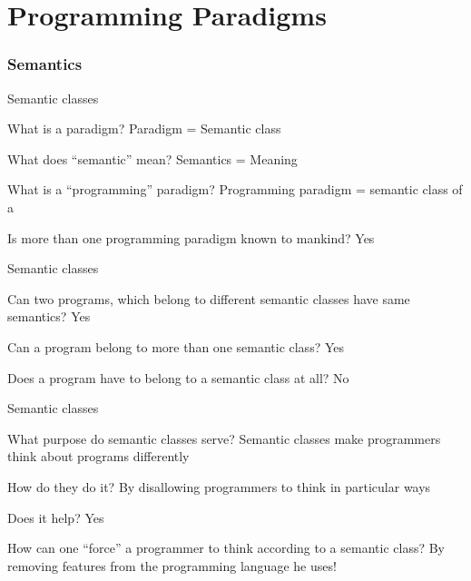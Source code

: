 \part[Programming Paradigms]{Programming Paradigms}
\section{Semantics}
\begin{frame}{Semantic classes}
\begin{block}{What is a paradigm?}
\pause
Paradigm = Semantic class
\end{block}
\pause
\begin{block}{What does ``semantic'' mean?}
\pause
Semantics = Meaning
\end{block}
\pause
\begin{block}{What is a ``programming'' paradigm?}
\pause
Programming paradigm = semantic class of a 
\end{block}
\pause
\begin{block}{Is more than one programming paradigm known to mankind?}
\pause
Yes
\end{block}
\end{frame}

\begin{frame}{Semantic classes}
\begin{block}{Can two programs, which belong to different semantic classes have
same semantics?}
\pause
Yes
\end{block}
\pause
\begin{block}{Can a program belong to more than one semantic class?}
\pause
Yes
\end{block}
\pause
\begin{block}{Does a program have to belong to a semantic class at all?}
\pause
No
\end{block}
\end{frame}

\begin{frame}{Semantic classes}
\begin{block}{What purpose do semantic classes serve?}
\pause
Semantic classes make programmers think about programs differently
\end{block}
\pause
\begin{block}{How do they do it?}
By disallowing programmers to think in particular ways
\end{block}
\pause
\begin{block}{Does it help?}
\pause
Yes
\end{block}
\pause
\begin{block}{
How can one ``force'' a programmer to think according to a semantic class?}
\pause
By \alert{removing} features from the programming language he uses!
\end{block}
\end{frame}

